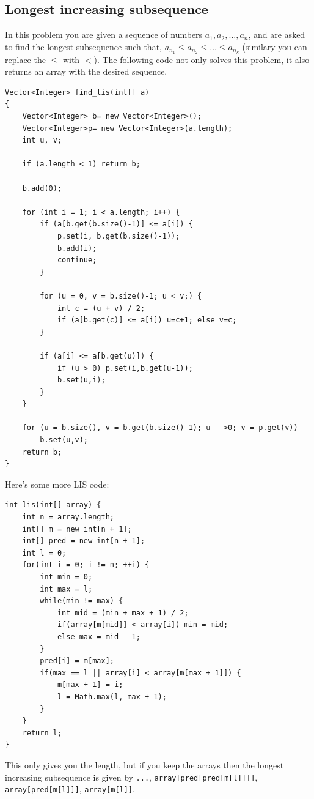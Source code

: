 \documentclass[a4paper,12pt]{article}
\begin{document}
\subsection{Longest increasing subsequence}
In this problem you are given a sequence of numbers $a_1,a_2,\dots,a_n$, and are asked to find the longest subsequence such that, $a_{n_1}\le a_{n_2}\le\dots\le a_{n_k}$ (similary you can replace the $\le$ with $<$).
The following code not only solves this problem, it also returns an array with the desired sequence.

\begin{lstlisting} 
Vector<Integer> find_lis(int[] a)
{
	Vector<Integer> b= new Vector<Integer>();
	Vector<Integer>p= new Vector<Integer>(a.length);
	int u, v;
 
	if (a.length < 1) return b;
 
	b.add(0);
 
	for (int i = 1; i < a.length; i++) {
		if (a[b.get(b.size()-1)] <= a[i]) {
			p.set(i, b.get(b.size()-1));
			b.add(i);
			continue;
		}
 
		for (u = 0, v = b.size()-1; u < v;) {
			int c = (u + v) / 2;
			if (a[b.get(c)] <= a[i]) u=c+1; else v=c;
		}
 
		if (a[i] <= a[b.get(u)]) {
			if (u > 0) p.set(i,b.get(u-1));
			b.set(u,i);
		}	
	}
 
	for (u = b.size(), v = b.get(b.size()-1); u-- >0; v = p.get(v))
		b.set(u,v);
	return b;
}
\end{lstlisting}

\noindent Here's some more LIS code:
\begin{lstlisting}
int lis(int[] array) {
	int n = array.length;
	int[] m = new int[n + 1];
	int[] pred = new int[n + 1];
	int l = 0;
	for(int i = 0; i != n; ++i) {
		int min = 0;
		int max = l;
		while(min != max) {
			int mid = (min + max + 1) / 2;
			if(array[m[mid]] < array[i]) min = mid;
			else max = mid - 1;
		}
		pred[i] = m[max];
		if(max == l || array[i] < array[m[max + 1]]) {
			m[max + 1] = i;
			l = Math.max(l, max + 1);
		}
	}
	return l;
}
\end{lstlisting}

This only gives you the length, but if you keep the arrays then the longest increasing subsequence is given by \lstinline/.../, \lstinline/array[pred[pred[m[l]]]]/, \lstinline/array[pred[m[l]]]/, \lstinline/array[m[l]]/.
\end{document}
